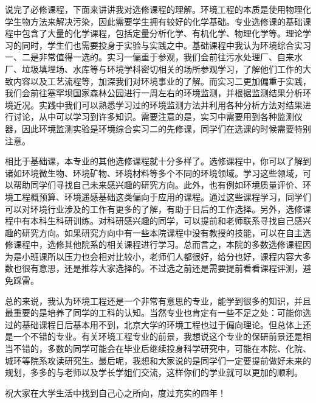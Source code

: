 \vspace{10pt}

说完了必修课程，下面来讲讲我对选修课程的理解。环境工程的本质是使用物理化学生物方法来解决污染，因此需要学生拥有较好的化学基础。专业选修课的基础课程中包含了大量的化学课程，包括定量分析化学、有机化学、物理化学等。理论学习的同时，学生们也需要投身于实验与实践之中。基础课程中我认为环境综合实习一、二是非常值得一选的。实习一偏重于参观，我们会前往污水处理厂、自来水厂、垃圾填埋场、水库等与环境学科密切相关的场所参观学习，了解他们工作的大致内容以及工艺流程等，加深我们对环境事业的了解。而实习二更加偏重于实践，我们会前往塞罕坝国家森林公园进行一周左右的环境监测，并根据监测结果分析环境近况。实践中我们可以熟悉学习过的环境监测方法并利用各种分析方法对结果进行讨论，从中可以学习到许多知识。需要注意的是，实习中需要用到各种监测仪器，因此环境监测实验是环境综合实习二的先修课，同学们在选课的时候需要特别注意。

\vspace{10pt}

相比于基础课，本专业的其他选修课程就十分多样了。选修课程中，你可以了解到诸如环境微生物、环境矿物、环境材料等多个不同的环境领域。学习这些领域，可以帮助同学们寻找自己未来感兴趣的研究方向。此外，也有例如环境质量评价、环境工程概预算、环境遥感基础这类偏向于应用的课程。通过这些课程学习，同学们可以对环境行业涉及的工作有更多的了解，有助于日后的工作选择。另外，选修课程中有本科生科研训练。对科研感兴趣的同学，可以提前和老师联系寻找自己感兴趣的研究方向。如果研究方向中有一些本院课程中没有教授的技能，可以在自主选修课程中，选修其他院系的相关课程进行学习。总而言之，本院的多数选修课程因为是小班课所以压力也会相对比较小，老师们人都很好，给分也好，课程内容大多数也很有意思，还是推荐大家选择的。不过选之前还是需要提前看看课程评测，避免踩雷。

\vspace{10pt}

总的来说，我认为环境工程还是一个非常有意思的专业，能学到很多的知识，并且最重要的是培养了同学的工科的认知。当然专业也肯定有一些不足之处：可能你选过的基础课程日后基本用不到，北京大学的环境工程也过于偏向理论。但总体上还是一个不错的专业。有关环境工程专业的前景，我想说这个专业的保研前景还是相当不错的，多数的同学可能会在毕业后继续投身科学研究中，可能在本院、化院、城环等院系攻读研究生。最后呢，我想和大家说的是同学们一定要提前做好未来的规划，多多的与老师以及学长学姐们交流，这样你们的学业就可以更加的顺利。

\vspace{10pt}

祝大家在大学生活中找到自己心之所向，度过充实的四年！

